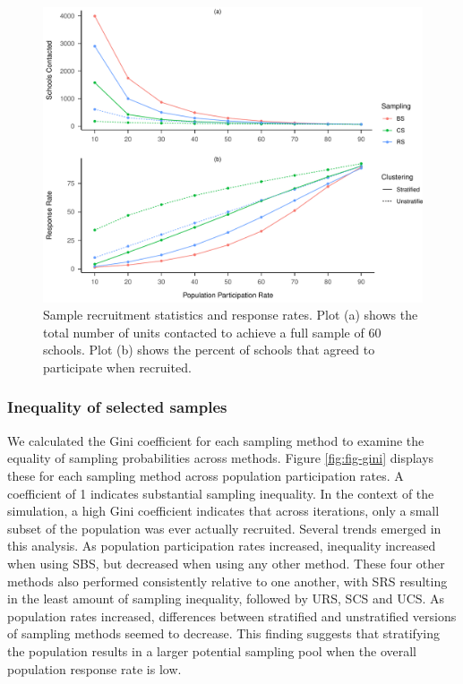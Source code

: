 \documentclass[man,floatsintext]{apa6}
\begin{document}
\begin{figure}
\centering
\includegraphics{GenSamp-Paper_files/figure-latex/fig-responses-1.pdf}
\caption{\label{fig:fig-responses}Sample recruitment statistics and response rates. Plot (a) shows the total number of units contacted to achieve a full sample of 60 schools. Plot (b) shows the percent of schools that agreed to participate when recruited.}
\end{figure}

\hypertarget{inequality-of-selected-samples}{%
\subsubsection{Inequality of selected samples}\label{inequality-of-selected-samples}}

We calculated the Gini coefficient for each sampling method to examine the equality of sampling probabilities across methods. Figure \ref{fig:fig-gini} displays these for each sampling method across population participation rates. A coefficient of 1 indicates substantial sampling inequality. In the context of the simulation, a high Gini coefficient indicates that across iterations, only a small subset of the population was ever actually recruited.
Several trends emerged in this analysis. As population participation rates increased, inequality increased when using SBS, but decreased when using any other method. These four other methods also performed consistently relative to one another, with SRS resulting in the least amount of sampling inequality, followed by URS, SCS and UCS. As population rates increased, differences between stratified and unstratified versions of sampling methods seemed to decrease. This finding suggests that stratifying the population results in a larger potential sampling pool when the overall population response rate is low.
\end{document}
